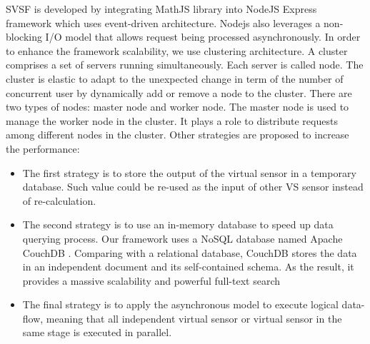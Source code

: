 SVSF is developed by integrating MathJS library into NodeJS Express framework  which uses event-driven architecture. Nodejs also leverages a non-blocking I/O model that allows request being processed asynchronously. In order to enhance the framework scalability, we use clustering architecture. A cluster comprises a set of servers running simultaneously. Each server is called node. The cluster is elastic to adapt to the unexpected change in term of the number of concurrent user by dynamically add or remove a node to the cluster. There are two types of nodes: master node and worker node. The master node is used to manage the worker node in the cluster. It plays a role to distribute requests among different nodes in the cluster. Other strategies are proposed to increase the performance:

\begin{itemize}
    \item The first strategy is to store the output of the virtual sensor in a temporary database. Such value could be re-used as the input of other VS sensor instead of re-calculation.
    \item The second strategy is to use an in-memory database  to speed up data querying process. Our framework uses a NoSQL database named Apache CouchDB . Comparing with a relational database, CouchDB stores the data in an independent document and its self-contained schema. As the result, it provides a massive scalability and powerful full-text search
    \item The final strategy is to apply the asynchronous model to execute logical data-flow, meaning that all independent virtual sensor or virtual sensor in the same stage is executed in parallel.
\end{itemize}

